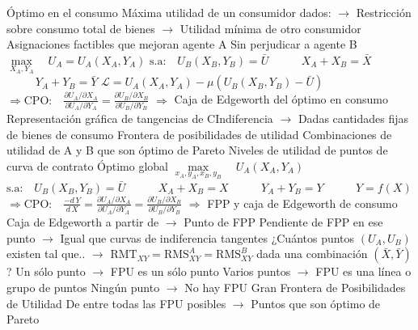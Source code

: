 \documentclass{nuevotema}
\begin{document}
\begin{esquemal}
			\3 Óptimo en el consumo
				\4 Máxima utilidad de un consumidor dados:
				\4[] $\to$ Restricción sobre consumo total de bienes
				\4[] $\to$ Utilidad mínima de otro consumidor
				\4[$\Rightarrow$] Asignaciones factibles que mejoran agente A
				\4[] Sin perjudicar a agente B
				\4[] $\underset{X_A, Y_A}{\max} \quad U_A = U_A(X_A, Y_A)$
				\4[] $\text{s.a:} \quad U_B(X_B, Y_B) = \bar{U}$
				\4[] $\quad \quad \; \; X_A + X_B = \bar{X}$
				\4[] $\quad \quad \; \; Y_A + Y_B = \bar{Y}$
				\4[] $\mathcal{L} = U_A(X_A, Y_A) - \mu (U_B(X_B, Y_B) - \bar{U})$
				\4[] $\Rightarrow \text{CPO:} \quad \frac{\partial U_A / \partial X_A }{\partial U_A / \partial Y_A } = \frac{\partial U_B / \partial X_B }{\partial U_B / \partial Y_B } $
				\4[] $\Rightarrow$ 
				\4 Caja de Edgeworth del óptimo en consumo
				\4[] Representación gráfica de tangencias de CIndiferencia
				\4[] $\to$ Dadas cantidades fijas de bienes de consumo
				\4[] 
				\4 Frontera de posibilidades de utilidad
				\4[] Combinaciones de utilidad de A y B que son óptimo de Pareto
				\4[] Niveles de utilidad de puntos de curva de contrato
				\4[] 
			\3 Óptimo global
				\4[] $\underset{x_A,y_A,x_B,y_B}{\max} \quad U_A (X_A, Y_A)$
				\4[] $\text{s.a:} \quad U_B(X_B, Y_B) = \bar{U}$
				\4[] $\quad \quad \; \; X_A + X_B = X$
				\4[] $\quad \quad \; \; Y_A + Y_B = Y$
				\4[] $\quad \quad \; \; Y = f(X)$
				\4[] $\Rightarrow \text{CPO:} \quad \frac{-d \, Y}{d \, X} = \frac{\partial U_A / \partial X_A}{\partial U_A / \partial Y_A} = \frac{\partial U_B / \partial X_B}{\partial U_B / \partial Y_B} $
				\4[] $\Rightarrow$ 
				\4 FPP y caja de Edgeworth de consumo
				\4[] Caja de Edgeworth a partir de
				\4[] $\to$ Punto de FPP
				\4[] Pendiente de FPP en ese punto
				\4[] $\to$ Igual que curvas de indiferencia tangentes
				\4[] 
				\4 ¿Cuántos puntos $(U_A, U_B)$ existen tal que..
				\4[] $\to$ $\text{RMT}_{XY} = \text{RMS}^A_{XY} =  \text{RMS}^B_{XY}$
				\4[] dada una combinación $(\bar{X},\bar{Y})$?
				\4[] Un sólo punto
				\4[] $\to$ FPU es un sólo punto
				\4[] Varios puntos
				\4[] $\to$ FPU es una línea o grupo de puntos
				\4[] Ningún punto
				\4[] $\to$ No hay FPU
				\4 Gran Frontera de Posibilidades de Utilidad
				\4[] De entre todas las FPU posibles
				\4[] $\to$ Puntos que son óptimo de Pareto

\end{esquemal}
\end{document}
